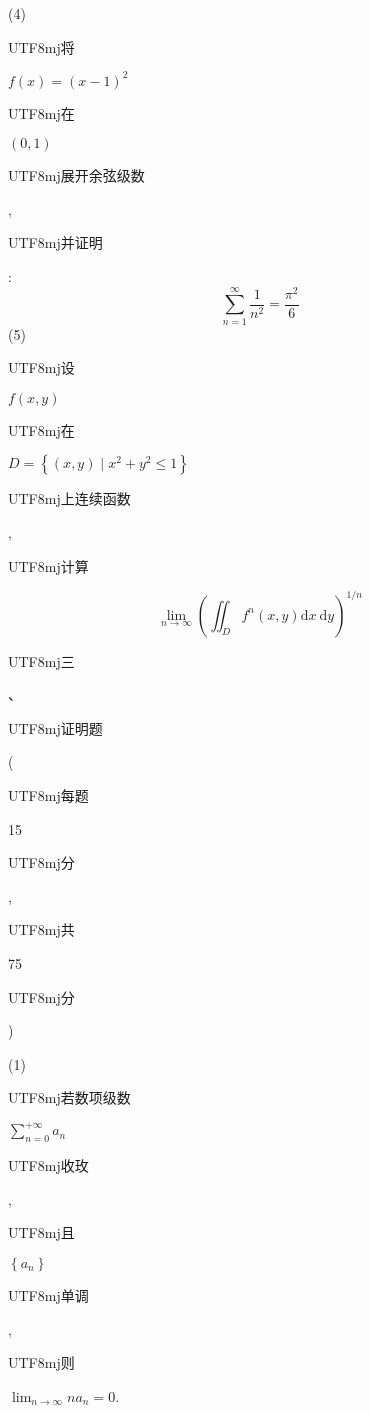 \documentclass[10pt]{article}
\begin{document}
(4) \begin{CJK}{UTF8}{mj}将\end{CJK} $f(x)=(x-1)^{2}$ \begin{CJK}{UTF8}{mj}在\end{CJK} $(0,1)$ \begin{CJK}{UTF8}{mj}展开余弦级数\end{CJK}, \begin{CJK}{UTF8}{mj}并证明\end{CJK}:
$$
\sum_{n=1}^{\infty} \frac{1}{n^{2}}=\frac{\pi^{2}}{6}
$$
(5) \begin{CJK}{UTF8}{mj}设\end{CJK} $f(x, y)$ \begin{CJK}{UTF8}{mj}在\end{CJK} $D=\left\{(x, y) \mid x^{2}+y^{2} \leqslant 1\right\}$ \begin{CJK}{UTF8}{mj}上连续函数\end{CJK}, \begin{CJK}{UTF8}{mj}计算\end{CJK}
$$
\lim _{n \rightarrow \infty}\left(\iint_{D} f^{n}(x, y) \mathrm{d} x \mathrm{~d} y\right)^{1 / n}
$$
\begin{CJK}{UTF8}{mj}三\end{CJK}、\begin{CJK}{UTF8}{mj}证明题\end{CJK} (\begin{CJK}{UTF8}{mj}每题\end{CJK} 15 \begin{CJK}{UTF8}{mj}分\end{CJK}, \begin{CJK}{UTF8}{mj}共\end{CJK} 75 \begin{CJK}{UTF8}{mj}分\end{CJK})

(1) \begin{CJK}{UTF8}{mj}若数项级数\end{CJK} $\sum_{n=0}^{+\infty} a_{n}$ \begin{CJK}{UTF8}{mj}收玫\end{CJK}, \begin{CJK}{UTF8}{mj}且\end{CJK} $\left\{a_{n}\right\}$ \begin{CJK}{UTF8}{mj}单调\end{CJK}, \begin{CJK}{UTF8}{mj}则\end{CJK} $\lim _{n \rightarrow \infty} n a_{n}=0$.
\end{document}
